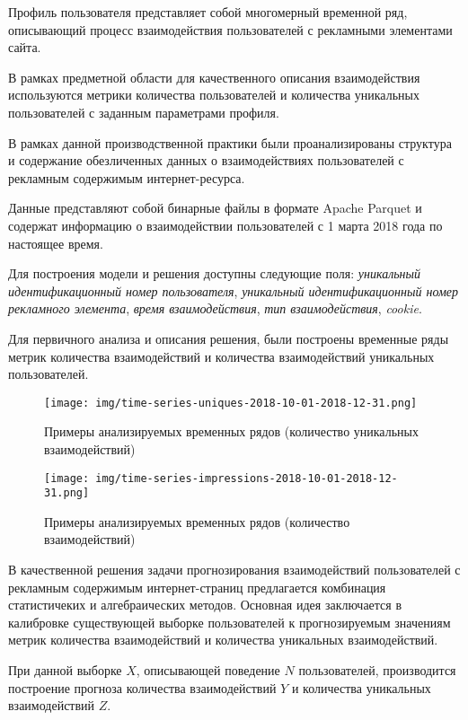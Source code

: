 \documentclass[a4paper, 12pt]{extreport}
\begin{document}
    Профиль пользователя представляет собой многомерный временной ряд, описывающий процесс взаимодействия пользователей
    с рекламными элементами сайта.

    В рамках предметной области для качественного описания взаимодействия используются метрики количества
    пользователей и количества уникальных пользователей с заданным параметрами профиля.

    В рамках данной производственной практики были проанализированы структура и содержание обезличенных данных
    о взаимодействиях пользователей с рекламным содержимым интернет-ресурса.

    Данные представляют собой бинарные файлы в формате Apache Parquet и содержат информацию о взаимодействии
    пользователей с 1 марта 2018 года по настоящее время.

    Для построения модели и решения доступны следующие поля:
    \textit{уникальный идентификационный номер пользователя},
    \textit{уникальный идентификационный номер рекламного элемента},
    \textit{время взаимодействия}, \textit{тип взаимодействия},
    \textit{cookie}.

    Для первичного анализа и описания решения, были построены временные ряды метрик количества взаимодействий и
    количества взаимодействий уникальных пользователей.

    \begin{figure}[ht]
        \centering
        \texttt{[image: img/time-series-uniques-2018-10-01-2018-12-31.png]}
        \caption{Примеры анализируемых временных рядов (количество уникальных взаимодействий)}
    \end{figure}

    \begin{figure}[ht]
        \centering
        \texttt{[image: img/time-series-impressions-2018-10-01-2018-12-31.png]}
        \caption{Примеры анализируемых временных рядов (количество взаимодействий)}
    \end{figure}

    В качественной решения задачи прогнозирования взаимодействий пользователей с рекламным содержимым интернет-страниц
    предлагается комбинация статистичеких и алгебраических методов. Основная идея заключается в калибровке существующей
    выборке пользователей к прогнозируемым значениям метрик количества взаимодействий и количества уникальных
    взаимодействий.

    При данной выборке $X$, описывающей поведение $N$ пользователей, производится построение прогноза количества
    взаимодействий $Y$ и количества уникальных взаимодействий $Z$.
\end{document}
